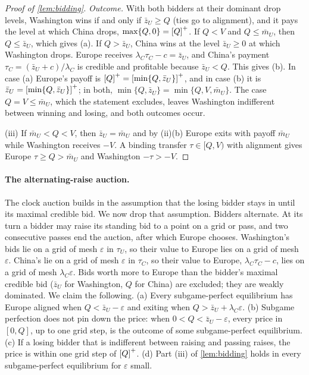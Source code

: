 \begin{proof}[Proof of \cref{lem:bidding}]
\emph{Outcome.} With both bidders at their dominant drop levels, Washington wins if and only if $\bar z_U\ge Q$ (ties go to alignment), and it pays the level at which China drops, $\max\{Q,0\}=\left[Q\right]^{+}$. If $Q<V$ and $Q\le\bar m_U$, then $Q\le\bar z_U$, which gives (a). If $Q>\bar z_U$, China wins at the level $\bar z_U\ge 0$ at which Washington drops. Europe receives $\lambda_C\tau_C-c=\bar z_U$, and China's payment $\tau_C=(\bar z_U+c)/\lambda_C$ is credible and profitable because $\bar z_U<Q$. This gives (b). In case (a) Europe's payoff is $\left[Q\right]^{+}=\left[\min\{Q,\bar z_U\}\right]^{+}$, and in case (b) it is $\bar z_U=\left[\min\{Q,\bar z_U\}\right]^{+}$; in both, $\min\{Q,\bar z_U\}=\min\{Q,V,\bar m_U\}$. The case $Q=V\le\bar m_U$, which the statement excludes, leaves Washington indifferent between winning and losing, and both outcomes occur.

(iii) If $\bar m_U<Q<V$, then $\bar z_U=\bar m_U$ and by (ii)(b) Europe exits with payoff $\bar m_U$ while Washington receives $-V$. A binding transfer $\tau\in[Q,V)$ with alignment gives Europe $\tau\ge Q>\bar m_U$ and Washington $-\tau>-V$.
\end{proof}

\paragraph{The alternating-raise auction.} The clock auction builds in the assumption that the losing bidder stays in until its maximal credible bid. We now drop that assumption. Bidders alternate. At its turn a bidder may raise its standing bid to a point on a grid or pass, and two consecutive passes end the auction, after which Europe chooses. Washington's bids lie on a grid of mesh $\varepsilon$ in $\tau_U$, so their value to Europe lies on a grid of mesh $\varepsilon$. China's lie on a grid of mesh $\varepsilon$ in $\tau_C$, so their value to Europe, $\lambda_C\tau_C-c$, lies on a grid of mesh $\lambda_C\varepsilon$. Bids worth more to Europe than the bidder's maximal credible bid ($\bar z_U$ for Washington, $Q$ for China) are excluded; they are weakly dominated. We claim the following. (a) Every subgame-perfect equilibrium has Europe aligned when $Q<\bar z_U-\varepsilon$ and exiting when $Q>\bar z_U+\lambda_C\varepsilon$. (b) Subgame perfection does not pin down the price: when $0<Q<\bar z_U-\varepsilon$, every price in $[0,Q]$, up to one grid step, is the outcome of some subgame-perfect equilibrium. (c) If a losing bidder that is indifferent between raising and passing raises, the price is within one grid step of $\left[Q\right]^{+}$. (d) Part (iii) of \cref{lem:bidding} holds in every subgame-perfect equilibrium for $\varepsilon$ small.

